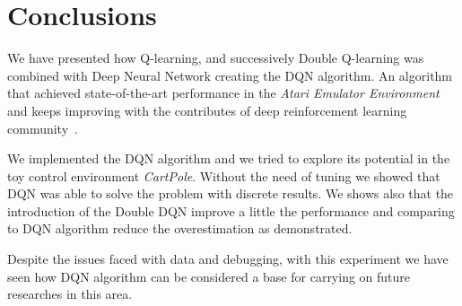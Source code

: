 \section{Conclusions}

We have presented how Q-learning, and successively Double Q-learning was combined with Deep Neural Network creating the DQN algorithm. 
An algorithm that achieved state-of-the-art performance in the \textit{Atari Emulator Environment} and keeps improving with the contributes of deep reinforcement learning community~\cite{DBLP:journals/corr/abs-1710-02298}.

We implemented the DQN algorithm and we tried to explore its potential in the toy control environment \textit{CartPole}. Without the need of tuning we showed that DQN was able to solve the problem with discrete results. We shows also that the introduction of the Double DQN improve a little the performance and comparing to DQN algorithm reduce the overestimation as \citeauthor{Hasselt:2016:DRL:3016100.3016191}  demonstrated.

Despite the issues faced with data and debugging, with this experiment we have seen how DQN algorithm can be considered a base for carrying on future researches in this area. 